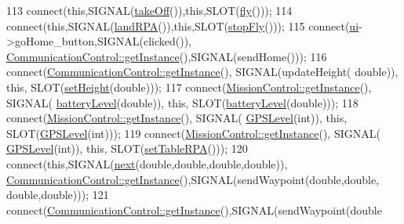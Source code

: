 \begin{DoxyCode}
113     connect(\textcolor{keyword}{this},SIGNAL(\hyperlink{a00008_a0f430392f18caaad506a00497cee44e1}{takeOff}()),\textcolor{keyword}{this},SLOT(\hyperlink{a00008_a714bf5396d7a420bc74b1ee7a00cc256}{fly}()));
114     connect(\textcolor{keyword}{this},SIGNAL(\hyperlink{a00008_ad24d2f849168e68c2a9534a017adbea2}{landRPA}()),\textcolor{keyword}{this},SLOT(\hyperlink{a00008_ab6d0aaa6d4db85f628c1eba5581d4c95}{stopFly}()));
115     connect(\hyperlink{a00008_a6dc041ef6a2ffb329928d2913e8344e6}{ui}->goHome\_button,SIGNAL(clicked()),
      \hyperlink{a00001_afebd43c1f2afd7ec0eb35f99e50f0964}{CommunicationControl::getInstance}(),SIGNAL(sendHome()));
116     connect(\hyperlink{a00001_afebd43c1f2afd7ec0eb35f99e50f0964}{CommunicationControl::getInstance}(), SIGNAL(updateHeight(\textcolor{keywordtype}{
      double})), \textcolor{keyword}{this}, SLOT(\hyperlink{a00008_af5b10f1aa2f28ed0c42d4f47efb693e9}{setHeight}(\textcolor{keywordtype}{double})));
117     connect(\hyperlink{a00010_a0ec34c9f235c87920390dd2425a8a162}{MissionControl::getInstance}(), SIGNAL(
      \hyperlink{a00008_afa417655857cee8564cd3f54b1491e98}{batteryLevel}(\textcolor{keywordtype}{double})), \textcolor{keyword}{this}, SLOT(\hyperlink{a00008_afa417655857cee8564cd3f54b1491e98}{batteryLevel}(\textcolor{keywordtype}{double})));
118     connect(\hyperlink{a00010_a0ec34c9f235c87920390dd2425a8a162}{MissionControl::getInstance}(), SIGNAL(
      \hyperlink{a00008_a5f35f3cac94851520f34bea03bd2642b}{GPSLevel}(\textcolor{keywordtype}{int})), \textcolor{keyword}{this}, SLOT(\hyperlink{a00008_a5f35f3cac94851520f34bea03bd2642b}{GPSLevel}(\textcolor{keywordtype}{int})));
119     connect(\hyperlink{a00010_a0ec34c9f235c87920390dd2425a8a162}{MissionControl::getInstance}(), SIGNAL(
      \hyperlink{a00008_a5f35f3cac94851520f34bea03bd2642b}{GPSLevel}(\textcolor{keywordtype}{int})), \textcolor{keyword}{this}, SLOT(\hyperlink{a00008_ab2e99d7a9834bf18fed0102994e933d3}{setTableRPA}()));
120     connect(\textcolor{keyword}{this},SIGNAL(\hyperlink{a00008_a6fffddb34a63d6cbf6e9362b65391d17}{next}(\textcolor{keywordtype}{double},\textcolor{keywordtype}{double},\textcolor{keywordtype}{double},\textcolor{keywordtype}{double})),
      \hyperlink{a00001_afebd43c1f2afd7ec0eb35f99e50f0964}{CommunicationControl::getInstance}(),SIGNAL(sendWaypoint(\textcolor{keywordtype}{double},\textcolor{keywordtype}{double},\textcolor{keywordtype}{
      double},\textcolor{keywordtype}{double})));
121     connect(\hyperlink{a00001_afebd43c1f2afd7ec0eb35f99e50f0964}{CommunicationControl::getInstance}(),SIGNAL(sendWaypoint(\textcolor{keywordtype}{double}

\end{DoxyCode}
